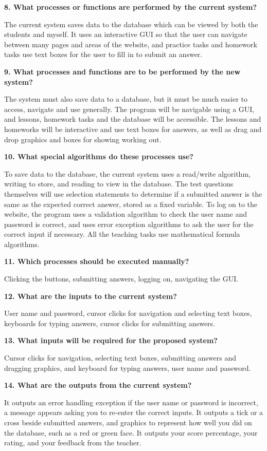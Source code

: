 \textbf{8. What processes or functions are performed by the current system?}

The current system saves data to the database which can be viewed by both the students and myself. It uses an interactive GUI so that the user can navigate between many pages and areas of the website, and practice tasks and homework tasks use text boxes for the user to fill in to submit an answer.

\textbf{9. What processes and functions are to be performed by the new system?}

The system must also save data to a database, but it must be much easier to access, navigate and use generally. The program will be navigable using a GUI, and lessons, homework tasks and the database will be accessible. The lessons and homeworks will be interactive and use text boxes for answers, as well as drag and drop graphics and boxes for showing working out.

\textbf{10. What special algorithms do these processes use?}

To save data to the database, the current system uses a read/write algorithm, writing to store, and reading to view in the database. The test questions themselves will use selection statements to determine if a submitted answer is the same as the expected correct answer, stored as a fixed variable. To log on to the website, the program uses a validation algorithm to check the user name and password is correct, and uses error exception algorithms to ask the user for the correct input if necessary. All the teaching tasks use mathematical formula algorithms.

\textbf{11. Which processes should be executed manually?}

Clicking the buttons, submitting answers, logging on, navigating the GUI.

\textbf{12. What are the inputs to the current system?}

User name and password, cursor clicks for navigation and selecting text boxes, keyboards for typing answers, cursor clicks for submitting answers.

\textbf{13. What inputs will be required for the proposed system?}

Cursor clicks for navigation, selecting text boxes, submitting answers and dragging graphics, and keyboard for typing answers, user name and password.

\textbf{14. What are the outputs from the current system?}

It outputs an error handling exception if the user name or password is incorrect, a message appears asking you to re-enter the correct inputs. It outputs a tick or a cross beside submitted answers, and graphics to represent how well you did on the database, such as a red or green face. It outputs your score percentage, your rating, and your feedback from the teacher. 

